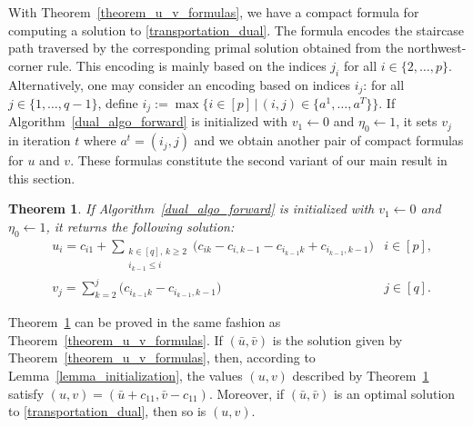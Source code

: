 \documentclass[letterpaper]{article}
\newtheorem{theorem}{Theorem}[section]
\begin{document}
With Theorem~\ref{theorem_u_v_formulas}, we have a compact formula for computing a solution to \eqref{transportation_dual}. The formula encodes the staircase path traversed by the corresponding primal solution obtained from the northwest-corner rule. This encoding is mainly based on the indices $j_i$ for all $i \in \{2, \dots, p\}$. Alternatively, one may consider an encoding based on indices $i_j$: for all $j \in \{1, \dots, q-1\}$, define $i_j := \max \{i \in [p] \, | \, (i,j) \in \{a^1, \dots, a^T\}\}$. If Algorithm~\ref{dual_algo_forward} is initialized with $v_1 \gets 0$ and $\eta_0 \gets 1$, it sets $v_j$ in iteration $t$ where $a^t = (i_j, j)$ and we obtain another pair of compact formulas for $u$ and $v$. These formulas constitute the second variant of our main result in this section.

\begin{theorem}\label{theorem_u_v_formulas_alternative}
    If Algorithm~\ref{dual_algo_forward} is initialized with $v_1 \gets 0$ and $\eta_0 \gets 1$, it returns the following solution:
    \begin{align}
        &u_i = c_{i1} + \sum_{\substack{k \in [q], \, k \geq 2 \\ i_{k-1} \leq i}} \bigl( c_{ik} - c_{i, k-1} - c_{i_{k-1} k} + c_{i_{k-1}, k-1} \bigr) &i \in [p], \label{u_formula_alternative} \\
        &v_j = \sum_{k=2}^{j} \bigl( c_{i_{k-1} k} - c_{i_{k-1}, k-1} \bigr) &j \in [q]. \label{v_formula_alternative}
    \end{align}
\end{theorem}

Theorem~\ref{theorem_u_v_formulas_alternative} can be proved in the same fashion as Theorem~\ref{theorem_u_v_formulas}. If $(\bar{u}, \bar{v})$ is the solution given by Theorem~\ref{theorem_u_v_formulas}, then, according to Lemma~\ref{lemma_initialization}, the values $(u,v)$ described by Theorem~\ref{theorem_u_v_formulas_alternative} satisfy $(u, v) = (\bar{u} + c_{11}, \bar{v} - c_{11})$. Moreover, if $(\bar{u}, \bar{v})$ is an optimal solution to \eqref{transportation_dual}, then so is $(u, v)$.
\end{document}
